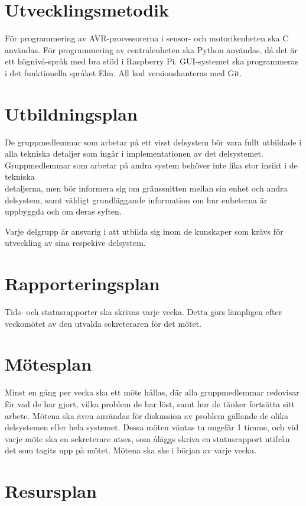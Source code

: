 \documentclass[a4paper,titlepage,12pt]{article}
\begin{document}
	
	\section{Utvecklingsmetodik}
	För programmering av AVR-processorerna i sensor- och motorikenheten ska C
	användas. För programmering av centralenheten ska Python användas, då det
	är ett högnivå-språk med bra stöd i Raspberry Pi. GUI-systemet ska
	programmeras i det funktionella språket Elm. All kod versionshanteras med Git.
	
	\section{Utbildningsplan}

	De gruppmedlemmar som arbetar på ett visst delsystem bör vara fullt
	utbildade i alla tekniska detaljer som ingår i implementationen av det
	delsystemet. Gruppmedlemmar som arbetar på andra system behöver inte lika
	stor insikt i de tekniska \\ detaljerna, men bör
	informera sig om gränssnitten mellan sin enhet och andra delsystem, samt väldigt 
	grundläggande information om hur enheterna är uppbyggda och om deras syften.

	Varje delgrupp är ansvarig i att utbilda sig inom de kunskaper som krävs
	för utveckling av sina respekive delsystem.

	\section{Rapporteringsplan}
	Tids- och statusrapporter ska skrivas varje vecka. Detta görs lämpligen
	efter veckomötet av den utvalda sekreteraren för det mötet.
	
	\section{Mötesplan}
	Minst en gång per vecka ska ett möte hållas, där alla gruppmedlemmar
	redovisar för vad de har gjort, vilka problem de har löst, samt hur de
	tänker fortsätta sitt arbete. Mötena ska även användas för diskussion av
	problem gällande de olika delsystemen eller hela systemet. Dessa möten väntas 
	ta ungefär 1 timme, och vid varje möte ska en sekreterare utses, som åläggs skriva 
	en statusrapport utifrån det som tagits upp på mötet. Mötena ska ske i början av
	varje vecka.
	
	
	\section{Resursplan}
  
\end{document}

